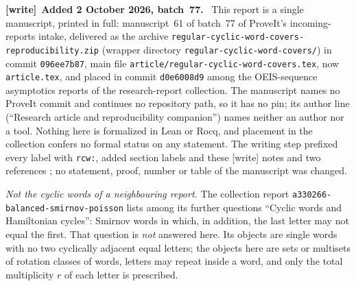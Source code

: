 \documentclass[11pt]{article}
\theoremstyle{definition}\newtheorem{definition}[theorem]{Definition}
\theoremstyle{remark}\newtheorem{remark}[theorem]{Remark}
\newenvironment{writenote}[1][]{\par\smallskip\begingroup\small
 \noindent\textbf{[write]}\if\relax\detokenize{#1}\relax\else~\textbf{#1.}\fi\ }%
 {\par\endgroup\smallskip}
\numberwithin{equation}{section}
\begin{document}
\begin{writenote}[Added 2 October 2026, batch~77]
This report is a single manuscript, printed in full: manuscript~61 of
batch~77 of ProveIt's incoming-reports intake, delivered as the archive
\texttt{regular-\allowbreak cyclic-\allowbreak word-\allowbreak covers-\allowbreak reproducibility.zip}
(wrapper directory \texttt{regular-\allowbreak cyclic-\allowbreak word-\allowbreak covers/})
in commit \texttt{096ee7b87}, main file
\texttt{article/\allowbreak regular-\allowbreak cyclic-\allowbreak word-\allowbreak covers.tex},
now \texttt{article.tex}, and placed in commit \texttt{d0e6008d9} among the
OEIS-sequence asymptotics reports of the research-report collection. The
manuscript names no ProveIt commit and continues no repository path, so it
has no pin; its author line (``Research article and reproducibility
companion'') names neither an author nor a tool. Nothing here is formalized
in Lean or Rocq, and placement in the collection confers no formal status on
any statement. The writing step prefixed every label with \texttt{rcw:},
added section labels and these \textsf{[write]} notes and two references
\cite{rcw-tai,rcw-cti}; no statement, proof, number or table of the
manuscript was changed.

\emph{Not the cyclic words of a neighbouring report.} The collection report
\texttt{a330266-\allowbreak balanced-\allowbreak smirnov-\allowbreak poisson}
lists among its further questions ``Cyclic words and Hamiltonian cycles'':
Smirnov words in which, in addition, the last letter may not equal the
first. That question is \emph{not} answered here. Its objects are single
words with no two cyclically adjacent equal letters; the objects here are
sets or multisets of rotation classes of words, letters may repeat inside a
word, and only the total multiplicity $r$ of each letter is prescribed.


\end{writenote}
\end{document}

